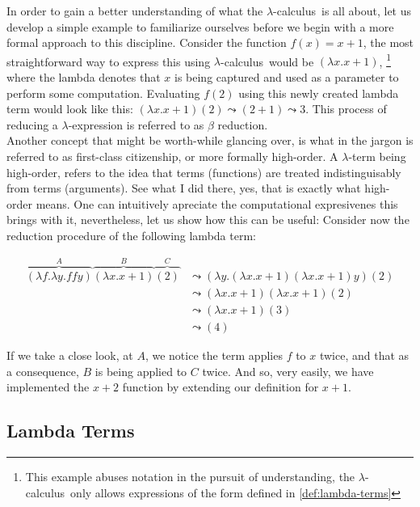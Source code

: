 \documentclass[12pt]{book}
\newcommand{\lcalc}{$\lambda$-calculus}
\newcommand{\la}{$\lambda$}
\newcommand{\curly}{\mathrel{\leadsto}}
\theoremstyle{plain}
\theoremstyle{definition}
\theoremstyle{definition}
\theoremstyle{remark}
\begin{document}
In order to gain a better understanding of what the \lcalc \ is all about, let us develop a simple example to familiarize ourselves before we begin with a more formal approach to this discipline. Consider the function $f(x) = x + 1$, the most straightforward way to express this using \lcalc \ would be $(\lambda x . x + 1 )$, \footnote{ This example abuses notation in the pursuit of understanding, the \lcalc \ only allows expressions of the form defined in \ref{def:lambda-terms} } where the lambda denotes that $x$ is being captured and used as a parameter to perform some computation. Evaluating $f(2)$ using this newly created lambda term would look like this: $(\lambda x . x + 1)(2) \curly (2 + 1) \curly 3$. This process of reducing a \la-expression is referred to as $\beta$ reduction.\\

Another concept that might be worth-while glancing over, is what in the jargon is referred to as first-class citizenship, or more formally high-order. A $\lambda$-term being high-order, refers to the idea that terms (functions) are treated indistinguisably from terms (arguments). See what I did there, yes, that is exactly what high-order means. One can intuitively apreciate the computational expresivenes this brings with it, nevertheless, let us show how this can be useful: Consider now the reduction procedure of the following lambda term:

\begin{align*}
  \overbrace { (\lambda f . \lambda y . f f y) }^{A} \overbrace{ (\lambda x . x + 1) }^{B} \overbrace{(2)}^{C}
  &\curly (\lambda y .(\lambda x . x + 1) (\lambda x . x + 1)y)(2) \\
  &\curly (\lambda x . x + 1)(\lambda x . x + 1)(2) \\
  &\curly (\lambda x . x + 1) (3) \\
  &\curly (4)
\end{align*}

If we take a close look, at $A$, we notice the term applies $f$ to $x$ twice, and that as a consequence, $B$ is being applied to $C$ twice. And so, very easily, we have implemented the $ x + 2 $ function by extending our definition for $x + 1$.

\subsection{\centering
  Lambda Terms}
\end{document}
